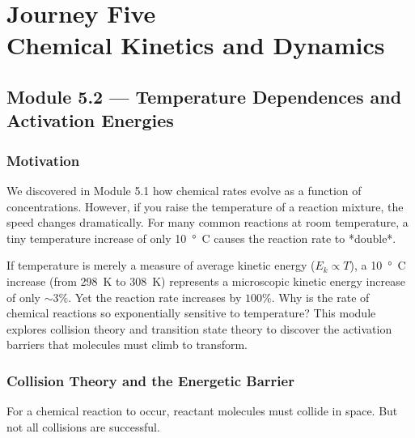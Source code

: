 \documentclass[12pt, a4paper]{book}
\begin{document}
\setcounter{chapter}{4}
\chapter[Journey 5 --- Chemical Kinetics and Dynamics]
        {Journey Five\\[8pt]
         \textcolor{ModuleColor}{\large Chemical Kinetics and Dynamics}}
\setcounter{section}{1}

\section{Module 5.2 --- Temperature Dependences and Activation Energies}
\label{sec:mod5.2}

\subsection*{Motivation}

We discovered in Module 5.1 how chemical rates evolve as a function of concentrations.
However, if you raise the temperature of a reaction mixture, the speed changes dramatically.
For many common reactions at room temperature, a tiny temperature increase of only \SI{10}{\degree C} causes the reaction rate to *double*.

If temperature is merely a measure of average kinetic energy ($E_k \propto T$), a \SI{10}{\degree C} increase (from \SI{298}{K} to \SI{308}{K}) represents a microscopic kinetic energy increase of only $\sim 3\%$.
Yet the reaction rate increases by $100\%$.
Why is the rate of chemical reactions so exponentially sensitive to temperature?
This module explores collision theory and transition state theory to discover the activation barriers that molecules must climb to transform.

\subsection{Collision Theory and the Energetic Barrier}

For a chemical reaction to occur, reactant molecules must collide in space. But not all collisions are successful.
\end{document}
